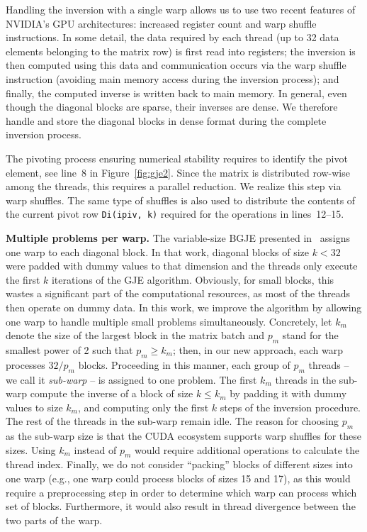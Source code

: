Handling the inversion with a single warp allows us to
use two recent features of NVIDIA's GPU architectures:
increased register count and warp shuffle instructions.
In some detail, the data required by each thread
(up to 32 data elements belonging to the matrix row)
is first read into registers;
the inversion is then computed using this data and communication occurs via the warp shuffle instruction
(avoiding main memory access during the inversion process);
and finally, the computed inverse is written back to main memory.
In general, even though the diagonal blocks are sparse,
their inverses are dense.
We therefore handle and store the diagonal blocks in dense format during the complete inversion process.

The pivoting process ensuring numerical stability requires to identify the pivot element, 
see line~8 in Figure~\ref{fig:gje2}. 
Since the matrix is distributed row-wise among the threads,
this requires a parallel reduction.
We realize this step via warp shuffles.
The same type of shuffles is also used to distribute the contents
of the current pivot row \texttt{Di(ipiv, k)}
required for the operations in lines~12--15.

\vspace*{1ex}
\noindent
\textbf{Multiple problems per warp.}
The variable-size BGJE presented in~\cite{Anzt:2017:BGE:3026937.3026940}
assigns one warp to each diagonal block. 
{In that work, diagonal} blocks of size $k<32$ were padded with dummy values to that dimension and the
threads only execute the first $k$ iterations of the GJE algorithm.
Obviously, for small blocks, 
this wastes a significant part of the computational resources,
as most of the threads then operate on dummy data.
{In this work, we} improve the algorithm by 
allowing one warp to handle multiple small problems simultaneously.
Concretely, {let $k_m$ denote the size of the largest block in the matrix batch
and $p_m$ stand for the smallest power of 2 such that $p_m \geq k_m$;
then, in our new approach, each warp processes $32 / p_m$ blocks.
Proceeding in this manner,} each group of $p_m$ threads -- we call it {\it sub-warp} -- 
is assigned to one problem.
The first $k_m$ threads in the sub-warp compute the inverse of a block
of size $k \leq k_m$ by padding it with dummy values to size $k_m$,
and computing {only} the first $k$ steps of the inversion procedure.
The rest of the threads in the sub-warp remain idle.
The reason for choosing $p_m$
as the sub-warp size is
that the CUDA ecosystem supports warp shuffles for these sizes.
Using $k_m$ instead of $p_m$ would require additional operations 
to calculate the thread index.
Finally, we do not consider ``packing'' blocks of different sizes into one warp
(e.g.,
one warp could process blocks of sizes 15 and 17),
as this {would require} a preprocessing step in order to determine
which warp can process which set of blocks. {Furthermore, 
it would} also result in thread divergence between the two parts of the warp.

